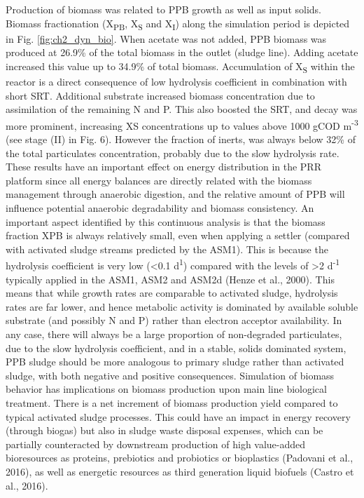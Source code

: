 \skippingparagraph
Production of biomass was related to PPB growth as well as input solids. Biomass fractionation (X\textsubscript{PB}, X\textsubscript{S} and X\textsubscript{I}) along the simulation period is depicted in Fig. \ref{fig:ch2_dyn_bio}. When acetate was not added, PPB biomass was produced at 26.9\% of the total biomass in the outlet (sludge line). Adding acetate increased this value up to 34.9\% of total biomass. Accumulation of X\textsubscript{S} within the reactor is a direct consequence of low hydrolysis coefficient in combination with short SRT. Additional substrate increased biomass concentration due to assimilation of the remaining N and P. This also boosted the SRT, and decay was more prominent, increasing XS concentrations up to values above 1000 gCOD m\textsuperscript{-3} (see stage (II) in Fig. 6). However the fraction of inerts, was always below 32\% of the total particulates concentration, probably due to the slow hydrolysis rate. These results have an important effect on energy distribution in the PRR platform since all energy balances are directly related with the biomass management through anaerobic digestion, and the relative amount of PPB will influence potential anaerobic degradability and biomass consistency. An important aspect identified by this continuous analysis is that the biomass fraction XPB is always relatively small, even when applying a settler (compared with activated sludge streams predicted by the ASM1). This is because the hydrolysis coefficient is very low (<0.1 d\textsuperscript{1}) compared with the levels of >2 d\textsuperscript{-1} typically applied in the ASM1, ASM2 and ASM2d \cite{Henze1987} (Henze et al., 2000). This means that while growth rates are comparable to activated sludge, hydrolysis rates are far lower, and hence metabolic activity is dominated by available soluble substrate (and possibly N and P) rather than electron acceptor availability. In any case, there will always be a large proportion of non-degraded particulates, due to the slow hydrolysis coefficient, and in a stable, solids dominated system, PPB sludge should be more analogous to primary sludge rather than activated sludge, with both negative and positive consequences.
\skippingparagraph
Simulation of biomass behavior has implications on biomass production upon main line biological treatment. There is a net increment of biomass production yield compared to typical activated sludge processes. This could have an impact in energy recovery (through biogas) but also in sludge waste disposal expenses, which can be partially counteracted by downstream production of high value-added bioresources as proteins, prebiotics and probiotics \cite{Matassa2015} or bioplastics (Padovani et al., 2016), as well as energetic resources as third generation liquid biofuels \cite{Castro2017}(Castro et al., 2016).


